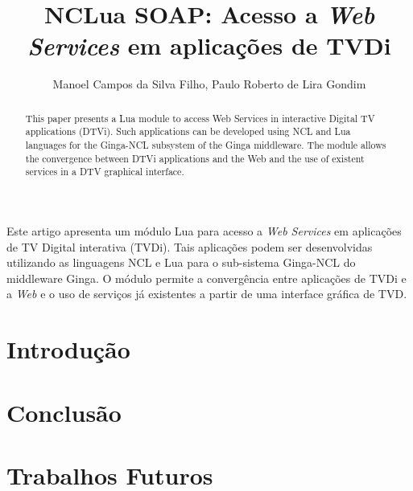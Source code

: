 \documentclass[12pt]{article}
\title{NCLua SOAP: Acesso a \textit{Web Services} em aplicações de TVDi}
\author{Manoel Campos da Silva Filho\inst{1,2}, Paulo Roberto de Lira Gondim\inst{2}}
\begin{document}
 

\maketitle

\begin{abstract}
This paper presents a Lua module to access Web Services in interactive Digital TV applications (DTVi). Such applications can be developed using NCL and Lua languages for the Ginga-NCL subsystem 
of the Ginga middleware. 
The module allows the convergence between DTVi applications and the Web
and the use of existent services in a DTV graphical interface.
\end{abstract}
     
\begin{resumo} 
Este artigo apresenta um módulo Lua
para acesso a \textit{Web Services} em aplicações de TV Digital interativa (TVDi). Tais aplicações
podem ser desenvolvidas utilizando as linguagens NCL e Lua para o sub-sistema
Ginga-NCL do middleware Ginga. O módulo permite a convergência entre aplicações de TVDi e a \textit{Web} e o
uso de serviços já existentes a partir de uma interface gráfica de TVD.
\end{resumo}

\section{Introdução} \label{sec:introducao}



\section{Conclusão} \label{sec:conclusao}

\section{Trabalhos Futuros} \label{sec:trabalhos-futuros}




\end{document}

